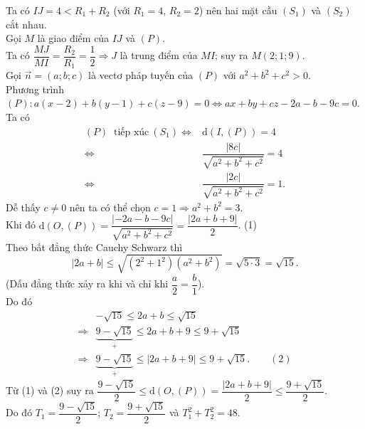 \begin{bt}
{\begin{center}
		\end{center}
		Ta có $IJ=4< R_1+R_2$ (với $R_1=4$, $R_2=2$) nên hai mặt cầu $(S_1)$ và $(S_2)$ cắt  nhau.\\
		Gọi $M$ là giao điểm của $IJ$  và $(P)$.\\
		Ta có $\dfrac{MJ}{MI}=\dfrac{R_2}{R_1}=\dfrac{1}{2}  \Rightarrow J$ là trung điểm của $MI$; suy ra $M(2; 1; 9)$.\\
		Gọi $\overrightarrow{n}=(a;b;c)$ là vectơ pháp tuyến của $(P)$ với $a^2+b^2+c^2>  0$.\\
		Phương trình $(P)\colon a(x-2)+b(y-1)+c(z-9)=0\Leftrightarrow ax+by+cz-2a-b-9c=0$.\\ 
		 Ta có
		\allowdisplaybreaks 
		\begin{align*}
			(P)~\text{ tiếp xúc}~ (S_1)\Leftrightarrow&  \mathrm{d}\left(I, (P)\right)=4
			\\ 
			 \Leftrightarrow& \dfrac{\left|8c\right|}{\sqrt{a^2+b^2+c^2}}=4
			 \\
			 \Leftrightarrow& \dfrac{\left|2c\right|}{\sqrt{a^2+b^2+c^2}}=1.
		\end{align*}
		Dễ thấy $c\ne 0$ nên ta có thể  chọn $c=1\Rightarrow a^2+b^2=3$.\\
		 Khi đó $\mathrm{d}\left(O, (P)\right)=\dfrac{\left|-2a-b-9c\right|}{\sqrt{a^2+b^2+c^2}}=\dfrac{\left|2a+b+9\right|}{2}$. \qquad(1)\\
		Theo bất đẳng thức Cauchy Schwarz thì  \[\left|2a+b\right|\le \sqrt{\left(2^2+1^2\right)\left(a^2+b^2\right)}=\sqrt{5\cdot 3}=\sqrt{15}.\]
		(Dấu  đẳng thức xảy ra khi và chỉ khi $\dfrac{a}{2}=\dfrac{b}{1}$).\\
		 Do đó
		\begin{align*}
			&-\sqrt{15} \le 2a+b\le \sqrt{15}\\ 
			\Rightarrow&  \underbrace{9-\sqrt{15}}_{+}\le 2a+b+9\le 9+\sqrt{15}
			\\ 
			\Rightarrow& \underbrace{9-\sqrt{15}}_{+}\le \left|2a+b+9\right|\le  9+\sqrt{15}. \qquad(2)
		\end{align*}
		Từ (1) và (2) suy ra $\dfrac{9-\sqrt{15}}{2} \le \mathrm{d}\left(O, (P)\right)=\dfrac{\left|2a+b+9\right|}{2} \le \dfrac{9+\sqrt{15}}{2}$.\\ 
		Do đó $T_1=\dfrac{9-\sqrt{15}}{2}$; $T_2=\dfrac{9+\sqrt{15}}{2}$  và $T_1^2+T_2^2=48$.
	} 
\end{bt}

